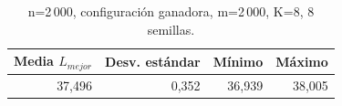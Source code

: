 \begin{table}[H]\centering
\caption{n=2\,000, configuración ganadora, m=2\,000, K=8, 8 semillas.}
\label{tab:n2000}
\begin{tabular}{rrrr}\toprule
\rowcolor{gray!25}
\textbf{Media $L_{mejor}$} & \textbf{Desv. estándar} & \textbf{Mínimo} & \textbf{Máximo} \\\midrule
37,496 & 0,352 & 36,939 & 38,005 \\
\bottomrule\end{tabular}\end{table}
